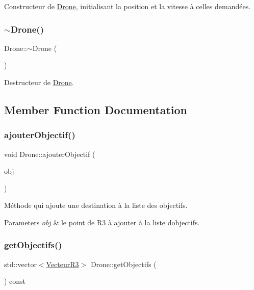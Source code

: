 Constructeur de \mbox{\hyperlink{class_drone}{Drone}}, initialisant la position et la vitesse à celles demandées. \mbox{\label{class_drone_a667075abb1eb5c54be6418884a387d14}} 
\subsubsection{\texorpdfstring{$\sim$\+Drone()}{~Drone()}}
{\footnotesize\ttfamily Drone\+::$\sim$\+Drone (\begin{DoxyParamCaption}{ }\end{DoxyParamCaption})\hspace{0.3cm}{\ttfamily [virtual]}}

Destructeur de \mbox{\hyperlink{class_drone}{Drone}}. 

\subsection{Member Function Documentation}
\mbox{\label{class_drone_aec517cb61a036852752219bad4e732c1}} 
\subsubsection{\texorpdfstring{ajouter\+Objectif()}{ajouterObjectif()}}
{\footnotesize\ttfamily void Drone\+::ajouter\+Objectif (\begin{DoxyParamCaption}\item[{const \mbox{\hyperlink{class_vecteur_r3}{Vecteur\+R3}} \&}]{obj }\end{DoxyParamCaption})}

Méthode qui ajoute une destination à la liste des objectifs. 
\begin{DoxyParams}{Parameters}
{\em obj} & le point de R3 à ajouter à la liste d\textquotesingle{}objectifs. \\
\hline
\end{DoxyParams}
\mbox{\label{class_drone_af1aae2a61acd717ecec989b51d744002}} 
\subsubsection{\texorpdfstring{get\+Objectifs()}{getObjectifs()}}
{\footnotesize\ttfamily std\+::vector$<$\mbox{\hyperlink{class_vecteur_r3}{Vecteur\+R3}}$>$ Drone\+::get\+Objectifs (\begin{DoxyParamCaption}{ }\end{DoxyParamCaption}) const}


